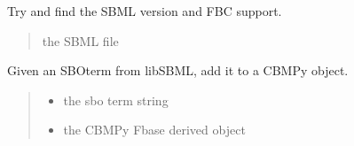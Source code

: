\documentclass[letterpaper,12pt,english]{sphinxmanual}
\begin{document}

\begin{fulllineitems}
\label{\detokenize{api/io:cbmpy.CBXML.sbml_fileFindVersion}}
\pysigstartsignatures
\pysiglinewithargsret
{}
{}
{}
\pysigstopsignatures
\sphinxAtStartPar
Try and find the SBML version and FBC support.
\begin{quote}\begin{description}
\sphinxAtStartPar
{} \textendash{} the SBML file

\end{description}\end{quote}

\end{fulllineitems}


\begin{fulllineitems}
\label{\detokenize{api/io:cbmpy.CBXML.setCBSBOterm}}
\pysigstartsignatures
\pysiglinewithargsret
{}
{\sphinxparamcomma {}}
{}
\pysigstopsignatures
\sphinxAtStartPar
Given an SBOterm from libSBML, add it to a CBMPy object.
\begin{quote}\begin{description}
\begin{itemize}
\item {} 
\sphinxAtStartPar
{} \textendash{} the sbo term string

\item {} 
\sphinxAtStartPar
{} \textendash{} the CBMPy Fbase derived object

\end{itemize}

\end{description}\end{quote}

\end{fulllineitems}
\end{document}
